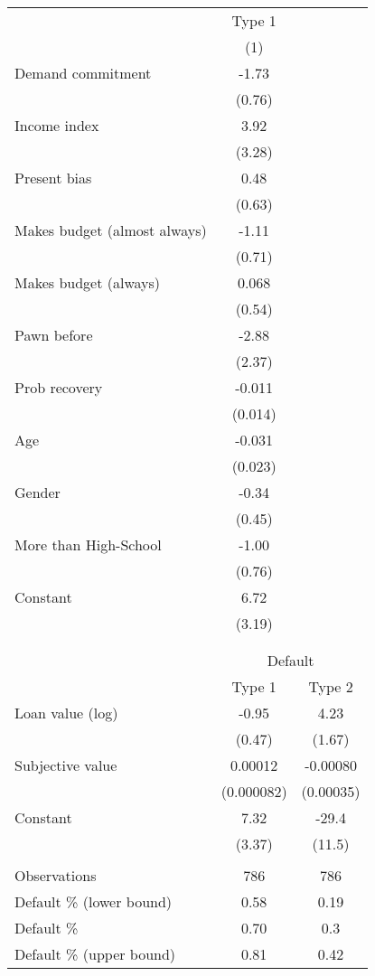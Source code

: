 \begin{tabular}{lcc}
\cmidrule{1-2}      & Type 1 &  \\
\cmidrule{1-2}      & (1)   &  \\
\cmidrule{1-2}Demand commitment  & -1.73 &  \\
      & (0.76) &  \\
Income index & 3.92  &  \\
      & (3.28) &  \\
Present bias & 0.48  &  \\
      & (0.63) &  \\
Makes budget (almost always) & -1.11 &  \\
      & (0.71) &  \\
Makes budget (always) & 0.068 &  \\
      & (0.54) &  \\
Pawn before & -2.88 &  \\
      & (2.37) &  \\
Prob recovery & -0.011 &  \\
      & (0.014) &  \\
Age   & -0.031 &  \\
      & (0.023) &  \\
Gender & -0.34 &  \\
      & (0.45) &  \\
More than High-School & -1.00 &  \\
      & (0.76) &  \\
Constant & 6.72  &  \\
      & (3.19) &  \\
\cmidrule{1-2}      &       &  \\
      &       &  \\
\midrule
      & \multicolumn{2}{c}{Default} \\
\midrule
      & Type 1 & Type 2 \\
\midrule
\midrule
Loan value (log) & -0.95 & 4.23 \\
      & (0.47) & (1.67) \\
Subjective value & 0.00012 & -0.00080 \\
      & (0.000082) & (0.00035) \\
Constant  & 7.32  & -29.4 \\
      & (3.37) & (11.5) \\
      &       &  \\
\midrule
Observations & 786   & 786 \\
\midrule
Default \% (lower bound) & 0.58  & 0.19 \\
Default \%  & 0.70  & 0.3 \\
Default \% (upper bound) & 0.81  & 0.42 \\
\bottomrule
\bottomrule
\end{tabular}%
